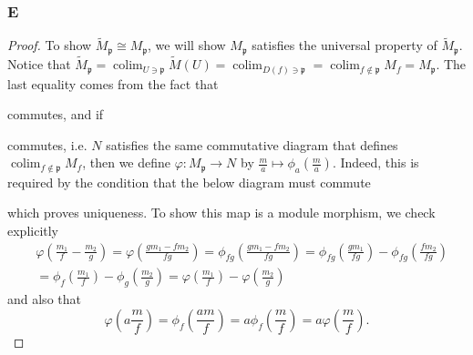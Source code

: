 \documentclass{article}
\newcommand{\frkp}{\mathfrak{p}}
\DeclareMathOperator{\colim}{\mathrm{colim}}
\theoremstyle{definition} %
\begin{document}
\subsubsection{E}\label{4.1.E}
\begin{proof}
    To show $\widetilde M_\frkp \cong M_\frkp$, we will show $M_\frkp$ satisfies the universal property of $\widetilde M_\frkp$. Notice that $\widetilde M_\frkp = \colim_{U \ni \frkp} \widetilde M(U) = \colim_{D(f) \ni \frkp} = \colim_{f\notin \frkp} M_f = M_\frkp$. The last equality comes from the fact that 
    \begin{center}
    \end{center}
    commutes, and if 
    \begin{center}
    \end{center}
    commutes, i.e. $N$ satisfies the same commutative diagram that defines $\colim_{f\notin \frkp} M_f$, then we define $\varphi: M_\frkp \to N$ by $\frac{m}{a}\mapsto \phi_a(\frac{m}{a})$. Indeed, this is required by the condition that the below diagram must commute 
    \begin{center}
    \end{center}
    which proves uniqueness. To show this map is a module morphism, we check explicitly 
    \begin{align*}
        &\varphi(\frac{m_1}{f}-\frac{m_2}{g}) = \varphi(\frac{gm_1-fm_2}{fg}) = \phi_{fg}(\frac{gm_1-fm_2}{fg}) = \phi_{fg}(\frac{gm_1}{fg})-\phi_{fg}(\frac{fm_2}{fg})\\
        &=\phi_f(\frac{m_1}{f})-\phi_g(\frac{m_2}{g}) = \varphi(\frac{m_1}{f})-\varphi(\frac{m_2}{g})
    \end{align*}
    and also that
    \[
    \varphi(a \frac{m}{f})=\phi_f(\frac{am}{f})=a\phi_f(\frac{m}{f})=a\varphi(\frac{m}{f}).
    \]
\end{proof}
\end{document}
